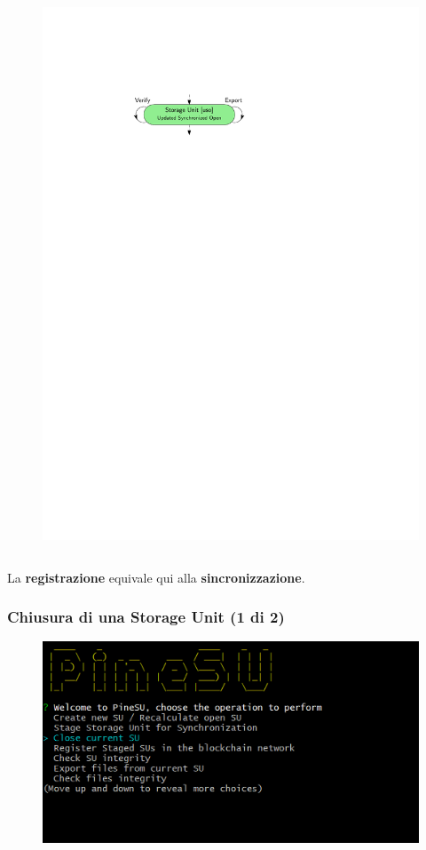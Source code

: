 \documentclass{beamer}
\begin{document}
\begin{frame}[fragile]
\begin{columns}
\begin{figure}
			\includegraphics[width=\textwidth]{figures/uso.pdf}
			\bigskip
		\end{figure}
	\end{columns}
	\vspace{-0.6cm}
	\hspace{-0.4cm}
	{\scriptsize La \textbf{registrazione} equivale qui alla \textbf{sincronizzazione}.}
\end{frame}

\begin{frame}
	\frametitle{Chiusura di una Storage Unit (1 di 2)}
	\begin{figure}
		\includegraphics[width=\textwidth]{figures/ops/3.png}
	\end{figure}
\end{frame}
\end{document}
